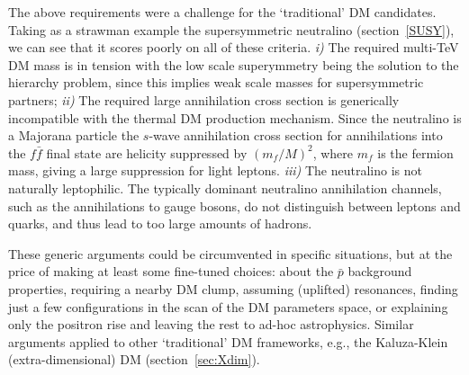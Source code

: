 \smallskip

The above  requirements were a challenge for the `traditional' DM candidates. 
Taking as a strawman example the supersymmetric neutralino (section~\ref{SUSY}), we can see that it scores poorly on all of these criteria.
{\em i)} The required multi-TeV DM mass is in tension with the low scale superymmetry being the solution to the hierarchy problem, since this implies weak scale masses for supersymmetric partners;
{\em ii)} The required large annihilation cross section is generically incompatible with the thermal DM production mechanism. Since the neutralino is a Majorana particle the $s$-wave annihilation cross section for annihilations into the $f\bar f$ final state are helicity suppressed by $(m_f/M)^2$, where $m_f$ is the fermion mass, giving a large suppression for light leptons.
{\em iii)} 
The neutralino is not naturally leptophilic. The typically dominant neutralino annihilation channels, such as the annihilations to gauge bosons,  do not distinguish between leptons and quarks, and thus lead to too large amounts of hadrons.

\noindent These generic arguments could be circumvented in specific situations, but at the price of making at least some fine-tuned choices:
about the $\bar p$ background properties, requiring a nearby DM clump, assuming (uplifted) resonances, 
finding just a few configurations in the scan of the DM parameters space, or
explaining only the positron rise and leaving the rest to ad-hoc astrophysics. 
Similar arguments applied to other `traditional' DM frameworks, e.g., the Kaluza-Klein (extra-dimensional) DM (section~\ref{sec:Xdim}).

\medskip

